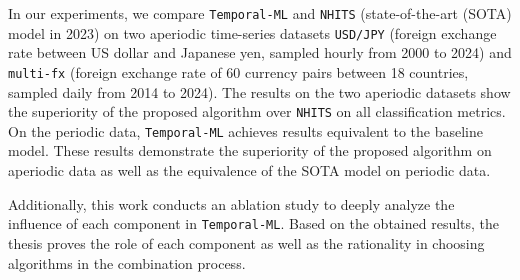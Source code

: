
In our experiments, we compare \verb|Temporal-ML| and \verb|NHITS| (state-of-the-art (SOTA) model in 2023) on two aperiodic time-series datasets \verb|USD/JPY| (foreign exchange rate between US dollar and Japanese yen, sampled hourly from 2000 to 2024) and \verb|multi-fx| (foreign exchange rate of 60 currency pairs between 18 countries, sampled daily from 2014 to 2024). The results on the two aperiodic datasets show the superiority of the proposed algorithm over \verb|NHITS| on all classification metrics. On the periodic data, \verb|Temporal-ML| achieves results equivalent to the baseline model. These results demonstrate the superiority of the proposed algorithm on aperiodic data as well as the equivalence of the SOTA model on periodic data.


Additionally, this work conducts an ablation study to deeply analyze the influence of each component in \verb|Temporal-ML|. Based on the obtained results, the thesis proves the role of each component as well as the rationality in choosing algorithms in the combination process.


